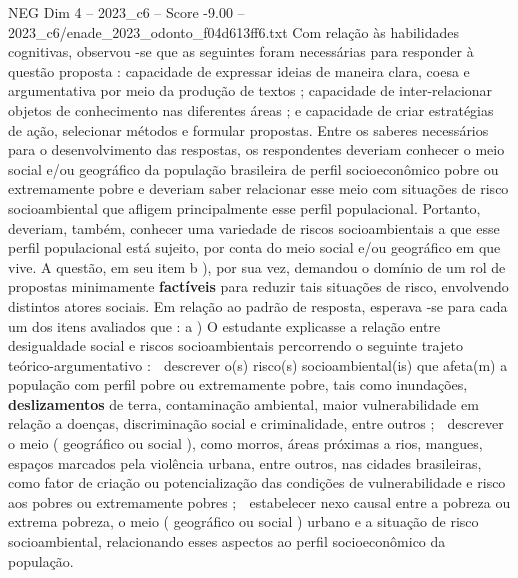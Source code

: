 \begin{textsample}{NEG Dim 4 – 2023\_c6 – Score -9.00 – 2023\_c6/enade\_2023\_odonto\_f04d613ff6.txt}
Com relação às habilidades cognitivas, observou -se que as seguintes foram necessárias para responder à questão proposta : capacidade de expressar ideias de maneira clara, coesa e argumentativa por meio da produção de textos ; capacidade de inter-relacionar objetos de conhecimento nas diferentes áreas ; e capacidade de criar estratégias de ação, selecionar métodos e formular propostas.
Entre os saberes necessários para o desenvolvimento das respostas, os respondentes deveriam conhecer o meio social e/ou geográfico da população brasileira de perfil socioeconômico pobre ou extremamente pobre e deveriam saber relacionar esse meio com situações de risco socioambiental que afligem principalmente esse perfil populacional.
Portanto, deveriam, também, conhecer uma variedade de riscos socioambientais a que esse perfil populacional está sujeito, por conta do meio social e/ou geográfico em que vive.
A questão, em seu item b ), por sua vez, demandou o domínio de um rol de propostas minimamente \textbf{factíveis} para reduzir tais situações de risco, envolvendo distintos atores sociais.
Em relação ao padrão de resposta, esperava -se para cada um dos itens avaliados que : a ) O estudante explicasse a relação entre desigualdade social e riscos socioambientais percorrendo o seguinte trajeto teórico-argumentativo :  descrever o(s) risco(s) socioambiental(is) que afeta(m) a população com perfil pobre ou extremamente pobre, tais como inundações, \textbf{deslizamentos} de terra, contaminação ambiental, maior vulnerabilidade em relação a doenças, discriminação social e criminalidade, entre outros ;  descrever o meio ( geográfico ou social ), como morros, áreas próximas a rios, mangues, espaços marcados pela violência urbana, entre outros, nas cidades brasileiras, como fator de criação ou potencialização das condições de vulnerabilidade e risco aos pobres ou extremamente pobres ;  estabelecer nexo causal entre a pobreza ou extrema pobreza, o meio ( geográfico ou social ) urbano e a situação de risco socioambiental, relacionando esses aspectos ao perfil socioeconômico da população.

\end{textsample}

